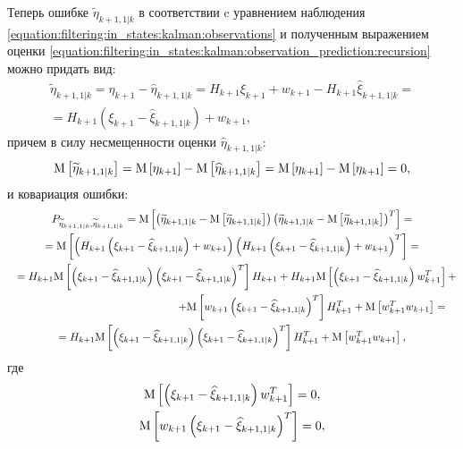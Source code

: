 Теперь ошибке $\widetilde{\eta}_{k+1,1|k}$ в соответствии c уравнением наблюдения \eqref{equation:filtering:in_states:kalman:observations} и полученным выражением оценки
\eqref{equation:filtering:in_states:kalman:observation_prediction:recursion} можно придать вид:
\begin{multline} \label{equation:filtering:in_states:kalman:observation_prediction:error}
	\widetilde{\eta}_{k+1,1|k}
		= \eta_{k+1} - \widehat{\eta}_{k+1,1|k}
		= H_{k+1} \xi_{k+1} + w_{k+1} - H_{k+1} \widehat{\xi}_{k+1,1|k} = \\
	= H_{k+1} \left ( \xi_{k+1} - \widehat{\xi}_{k+1,1|k} \right ) + w_{k+1}
	,
\end{multline}
причем в силу несмещенности оценки $\widehat{\eta}_{k+1,1|k}$:
\begin{equation} \label{equation:filtering:in_states:kalman:observation_prediction:unbiasedness}
	\mathrm{M} \left [ \widetilde{\eta}_{k+1,1|k} \right ]
		= \mathrm{M} \left [ \eta_{k+1} \right ] - \mathrm{M} \left [ \widehat{\eta}_{k+1,1|k} \right ]
		= \mathrm{M} \left [ \eta_{k+1} \right ] - \mathrm{M} \left [ \eta_{k+1} \right ]
		= 0
	,
\end{equation}
и ковариация ошибки:
\begin{multline*}
	P_{\widetilde{\eta}_{k+1, 1|k}, \widetilde{\eta}_{k+1, 1|k}}
		= \outerexpectation{\widetilde{\eta}_{k+1, 1|k}}{\widetilde{\eta}_{k+1, 1|k}} = \\
	= \expectation{ \left ( H_{k+1} \left ( \xi_{k+1} - \widehat{\xi}_{k+1,1|k} \right ) + w_{k+1} \right ) \left ( H_{k+1} \left ( \xi_{k+1} - \widehat{\xi}_{k+1,1|k} \right ) + w_{k+1} \right )^T} = \\
	\shoveleft{
		= H_{k+1} \expectation{ \left ( \xi_{k+1} - \widehat{\xi}_{k+1,1|k} \right ) \left ( \xi_{k+1} - \widehat{\xi}_{k+1,1|k} \right )^T } H_{k+1}
		+ H_{k+1} \expectation{ \left ( \xi_{k+1} - \widehat{\xi}_{k+1,1|k} \right ) w_{k+1}^T } +
	} \\
	\shoveright{
		+ \expectation{ w_{k+1} \left ( \xi_{k+1} - \widehat{\xi}_{k+1,1|k} \right )^T } H_{k+1}^T +
		\expectation{ w_{k+1}^T w_{k+1} } =
	} \\
	= H_{k+1} \expectation{\left ( \xi_{k+1} - \widehat{\xi}_{k+1,1|k} \right ) \left ( \xi_{k+1} - \widehat{\xi}_{k+1,1|k} \right )^T } H_{k+1}^T
		+ \expectation{ w_{k+1}^T w_{k+1} }
	,
\end{multline*}
где
\begin{gather*}
	\mathrm{M} \left [  \left ( \xi_{k+1} - \widehat{\xi}_{k+1,1|k} \right ) w_{k+1}^T  \right ] = 0 , \\
	\mathrm{M} \left [  w_{k+1} \left ( \xi_{k+1} - \widehat{\xi}_{k+1,1|k} \right )^T  \right ] = 0 ,
\end{gather*}
